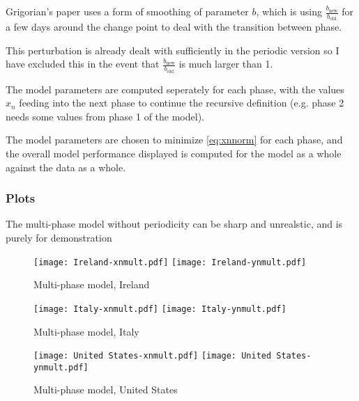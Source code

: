 Grigorian's paper uses a form of smoothing of parameter $b$, which is using $\frac{b_{\text{new}}}{b_{\text{old}}}$ for a few days around the change point to deal with the transition between phase.

This perturbation is already dealt with sufficiently in the periodic version so I have excluded this in the event that  $\frac{b_{\text{new}}}{b_{\text{old}}}$ is much larger than 1. 

The model parameters are computed seperately for each phase, with the values $x_n$ feeding into the next phase to continue the recursive definition (e.g. phase 2 needs some values from phase 1 of the model).

The model parameters are chosen to minimize \eqref{eq:xnnorm} for each phase, and the overall model performance displayed is computed for the model as a whole against the data as a whole.

\subsubsection{Plots}

The multi-phase model without periodicity can be sharp and unrealstic, and is purely for demonstration

\begin{figure}[H]
  \texttt{[image: Ireland-xnmult.pdf]} \label{fig:ireland-xnmult}
\endminipage\hfill
{}
  \texttt{[image: Ireland-ynmult.pdf]} \label{fig:ireland-ynmult}
\endminipage
\caption{Multi-phase model, Ireland}
\end{figure}

\begin{figure}[H]
  \texttt{[image: Italy-xnmult.pdf]} \label{fig:italy-xnmult}
\endminipage\hfill
{}
  \texttt{[image: Italy-ynmult.pdf]} \label{fig:italy-ynmult}
\endminipage
\caption{Multi-phase model, Italy}
\end{figure}

\begin{figure}[H]
  \texttt{[image: United States-xnmult.pdf]} \label{fig:usa-xnmult}
\endminipage\hfill
{}
  \texttt{[image: United States-ynmult.pdf]} \label{fig:usa-ynmult}
\endminipage
\caption{Multi-phase model, United States}
\end{figure}

